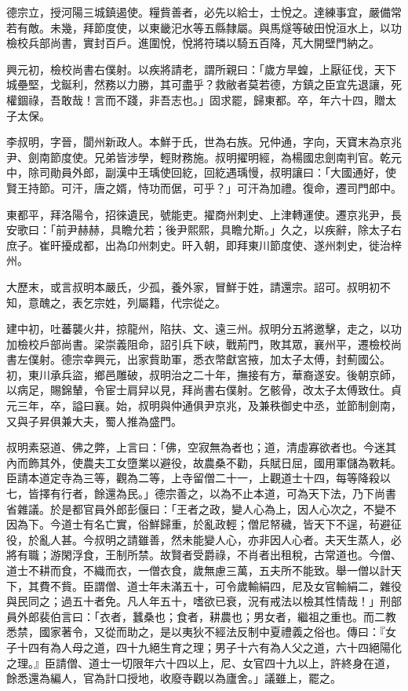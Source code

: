 \begin{pinyinscope}
 德宗立，授河陽三城鎮遏使。糧貲善者，必先以給士，士悅之。達練事宜，嚴備常若有敵。未幾，拜節度使，以東畿汜水等五縣隸屬。與馬燧等破田悅洹水上，以功檢校兵部尚書，實封百戶。進圍悅，悅將符璘以騎五百降，芃大開壁門納之。



 興元初，檢校尚書右僕射。以疾將請老，謂所親曰：「歲方旱蝗，上厭征伐，天下城壘堅，戈鋋利，然務以力勝，其可盡乎？救敝者莫若德，方鎮之臣宜先退讓，死權錮祿，吾敢哉！言而不踐，非吾志也。」固求罷，歸東都。卒，年六十四，贈太子太保。



 李叔明，字晉，閬州新政人。本鮮于氏，世為右族。兄仲通，字向，天寶末為京兆尹、劍南節度使。兄弟皆涉學，輕財務施。叔明擢明經，為楊國忠劍南判官。乾元中，除司勛員外郎，副漢中王瑀使回紇，回紇遇瑀慢，叔明讓曰：「大國通好，使賢王持節。可汗，唐之婿，恃功而倨，可乎？」可汗為加禮。復命，遷司門郎中。



 東都平，拜洛陽令，招徠遺民，號能吏。擢商州刺史、上津轉運使。遷京兆尹，長安歌曰：「前尹赫赫，具瞻允若；後尹熙熙，具瞻允斯。」久之，以疾辭，除太子右庶子。崔旰擾成都，出為卬州刺史。旰入朝，即拜東川節度使、遂州刺史，徙治梓州。



 大歷末，或言叔明本嚴氏，少孤，養外家，冒鮮于姓，請還宗。詔可。叔明初不知，意醜之，表乞宗姓，列屬籍，代宗從之。



 建中初，吐蕃襲火井，掠龍州，陷扶、文、遠三州。叔明分五將邀擊，走之，以功加檢校戶部尚書。梁崇義阻命，詔引兵下峽，戰荊門，敗其眾，襄州平，遷檢校尚書左僕射。德宗幸興元，出家貲助軍，悉衣幣獻宮掖，加太子太傅，封薊國公。初，東川承兵盜，鄉邑雕破，叔明治之二十年，撫接有方，華裔遂安。後朝京師，以病足，賜錦輦，令宦士肩舁以見，拜尚書右僕射。乞骸骨，改太子太傅致仕。貞元三年，卒，謚曰襄。始，叔明與仲通俱尹京兆，及兼秩御史中丞，並節制劍南，又與子昇俱兼大夫，蜀人推為盛門。



 叔明素惡道、佛之弊，上言曰：「佛，空寂無為者也；道，清虛寡欲者也。今迷其內而飾其外，使農夫工女墮業以避役，故農桑不勸，兵賦日屈，國用軍儲為斁耗。臣請本道定寺為三等，觀為二等，上寺留僧二十一，上觀道士十四，每等降殺以七，皆擇有行者，餘還為民。」德宗善之，以為不止本道，可為天下法，乃下尚書省雜議。於是都官員外郎彭偃曰：「王者之政，變人心為上，因人心次之，不變不因為下。今道士有名亡實，俗鮮歸重，於亂政輕；僧尼帑穢，皆天下不逞，茍避征役，於亂人甚。今叔明之請雖善，然未能變人心，亦非因人心者。夫天生蒸人，必將有職；游閑浮食，王制所禁。故賢者受爵祿，不肖者出租稅，古常道也。今僧、道士不耕而食，不織而衣，一僧衣食，歲無慮三萬，五夫所不能致。舉一僧以計天下，其費不貲。臣謂僧、道士年未滿五十，可令歲輸絹四，尼及女官輸絹二，雜役與民同之；過五十者免。凡人年五十，嗜欲已衰，況有戒法以檢其性情哉！」刑部員外郎裴伯言曰：「衣者，蠶桑也；食者，耕農也；男女者，繼祖之重也。而二教悉禁，國家著令，又從而助之，是以夷狄不經法反制中夏禮義之俗也。傳曰：『女子十四有為人母之道，四十九絕生育之理；男子十六有為人父之道，六十四絕陽化之理。』臣請僧、道士一切限年六十四以上，尼、女官四十九以上，許終身在道，餘悉還為編人，官為計口授地，收廢寺觀以為廬舍。」議雖上，罷之。




\end{pinyinscope}
